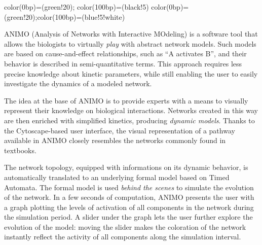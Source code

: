 

{color(0bp)=(green!20); color(100bp)=(black!5)}
{color(0bp)=(green!20);color(100bp)=(blue!5!white)}
\makeatletter
{}
\makeatother

\begin{mdframed}[style=ANIMOstyle]
\scriptsize
ANIMO (Analysis of Networks with Interactive MOdeling)
is a software tool that allows the biologists to virtually \emph{play} with abstract network models.
Such models are based on cause-and-effect relationships, such as ``A activates B'', and their
behavior is described in semi-quantitative terms. This approach requires less precise knowledge about
kinetic parameters, while still enabling the user to easily investigate the dynamics of a modeled network.

The idea at the base of ANIMO is to provide experts with a means to visually represent their knowledge on biological interactions.
Networks created in this way are then enriched with simplified kinetics, producing \emph{dynamic models}.
Thanks to the Cytoscape-based user interface, the visual representation of a pathway available in ANIMO
closely resembles the networks commonly found in textbooks.

The network topology, equipped with informations
on its dynamic behavior, is automatically translated to an underlying formal model based on Timed Automata.
The formal model is used \emph{behind the scenes} to simulate the evolution of the network.
In a few seconds of computation, ANIMO presents the user with a graph plotting the levels of activation
of all components in the network during the simulation period.
A slider under the graph lets the user further explore the evolution of the model:
moving the slider makes the coloration of the network instantly reflect the activity of
all components along the simulation interval.
\end{mdframed}



